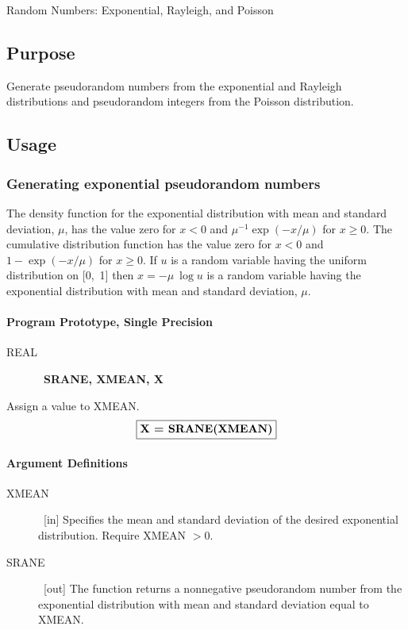 \documentclass[twoside]{MATH77}
\begin{document}
 Random Numbers: Exponential, Rayleigh, and Poisson


\subsection{Purpose}

Generate pseudorandom numbers from the exponential and Rayleigh
distributions and pseudorandom integers from the Poisson distribution.

\subsection{Usage}

\subsubsection{Generating exponential pseudorandom numbers}

The density function for the exponential distribution with mean and standard
deviation, $\mu $, has the value zero for $x < 0$ and $\mu^{-1} \exp (-x/\mu )$ for $%
x \geq 0$. The cumulative distribution function has the value zero for $x <
0 $ and $1- \exp (- x/\mu )$ for $x \geq 0$. If $u$ is a random variable
having the uniform distribution on [0,~1] then $x = - \mu \ \log u$ is a
random variable having the exponential distribution with mean and standard
deviation, $\mu .$

\paragraph{Program Prototype, Single Precision}

\begin{description}
\item[REAL]  \ {\bf SRANE, XMEAN, X}
\end{description}

Assign a value to XMEAN.
$$
\fbox{{\bf X = SRANE(XMEAN)}}
$$
\paragraph{Argument Definitions}

\begin{description}
\item[XMEAN]  \ [in] Specifies the mean and standard deviation of the
desired exponential distribution. Require XMEAN $>0.$

\item[SRANE]  \ [out] The function returns a nonnegative pseudorandom number
from the exponential distribution with mean and standard deviation equal to
XMEAN.
\end{description}
\end{document}
